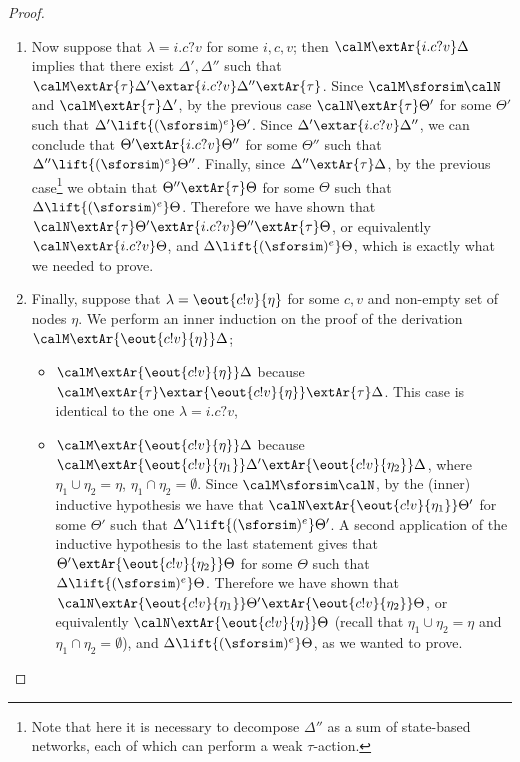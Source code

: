\documentclass{LMCS}
\begin{document}
\begin{proof}
\begin{enumerate}
\item Now suppose that $\lambda = i.c?v$ for some $i, c, v$; then $\calM \extAr{i.c?v} \Delta$ 
implies that there exist $\Delta', \Delta''$ such that $\calM \extAr{\tau} \Delta'\extar{i.c?v} \Delta'' \extAr{\tau}$. 
Since $\calM \sforsim \calN$ and $\calM \extAr{\tau} \Delta'$, by the previous case $\calN \extAr{\tau} \Theta'$ 
for some $\Theta'$ such that $\Delta' \lift{(\sforsim)^e} \Theta'$. Since $\Delta' \extar{i.c?v} \Delta''$, we can 
conclude that $\Theta' \extAr{i.c?v} \Theta''$ for some $\Theta''$ such that 
$\Delta'' \lift{(\sforsim)^e} \Theta''$. Finally, since $\Delta'' \extAr{\tau} \Delta$, 
by the previous case\footnote{Note that here it is necessary to decompose $\Delta''$ as a sum 
of state-based networks, each of which can perform a weak $\tau$-action.} we obtain that $\Theta'' \extAr{\tau} \Theta$ for some 
$\Theta$ such that $\Delta \lift{(\sforsim)^e} \Theta$. 
Therefore we have shown that $\calN \extAr{\tau} \Theta' \extAr{i.c?v}\Theta'' \extAr{\tau} \Theta$, 
or equivalently $\calN \extAr{i.c?v} \Theta$, and $\Delta \lift{(\sforsim)^e} \Theta$, which 
is exactly what we needed to prove.

\item Finally, suppose that $\lambda = \eout{c!v}{\eta}$ for some $c, v$ and non-empty set of 
nodes $\eta$. We perform an inner induction on the proof of the derivation $\calM \extAr{\eout{c!v}{\eta}} \Delta$;
\begin{itemize}
\item $\calM \extAr{\eout{c!v}{\eta}} \Delta$ because $\calM \extAr{\tau} \extar{\eout{c!v}{\eta}} \extAr{\tau} \Delta$. 
This case is identical to the one $\lambda = i.c?v$,
\item $\calM \extAr{\eout{c!v}{\eta}} \Delta$ because $\calM \extAr{\eout{c!v}{\eta_1}} \Delta' \extAr{\eout{c!v}{\eta_2}} \Delta$, 
where $\eta_1 \cup \eta_2 = \eta$, 
$\eta_1 \cap \eta_2 = \emptyset$. Since $\calM \sforsim \calN$, by the (inner) inductive hypothesis we have that 
$\calN \extAr{\eout{c!v}{\eta_1}} \Theta'$ for some $\Theta'$ such that $\Delta' \lift{(\sforsim)^e} \Theta'$. 
A second application of the inductive hypothesis to the last statement gives that $\Theta' \extAr{\eout{c!v}{\eta_2}} \Theta$ 
for some $\Theta$ such that $\Delta \lift{(\sforsim)^e} \Theta$. Therefore we have shown that 
$\calN \extAr{\eout{c!v}{\eta_1}} \Theta' \extAr{\eout{c!v}{\eta_2}} \Theta$, or equivalently 
$\calN\extAr{\eout{c!v}{\eta}} \Theta$ (recall that $\eta_1 \cup \eta_2 = \eta$ and $\eta_1 \cap \eta_2 = \emptyset$), 
and $\Delta \lift{(\sforsim)^e} \Theta$, as we wanted to prove.\qedhere
\end{itemize} 
\end{enumerate}
\end{proof}\smallskip
\end{document}
